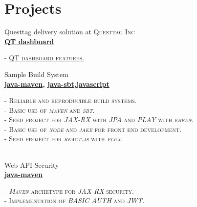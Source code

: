 \documentclass[10pt]{article} %
\begin{document}
{\begin{minipage}[t]{0.5\textwidth}
\section{Projects} 



{\raggedright\large Questtag delivery solution at \textsc{Questtag Inc}\\
\large\textbf{\href{https://dashboard.questtag.com}{QT dashboard}}\\[5pt]}

\textsc{- \href{http://www.questtag.com/features/}{QT dashboard features.}}\\




{\raggedright\large Sample Build System \\
	\large\textbf{\href {https://github.com/Bitaron/java-maven}{java-maven}, \href{https://github.com/Bitaron/java-sbt}{java-sbt},\href{https://github.com/Bitaron/js}{javascript}}\\[5pt]}
\textsc{- Reliable and reproducible build systems.}\\
\textsc{- Basic use of \textit{maven} and \textit{sbt}. }\\
\textsc{- Seed project for \textit{JAX-RX} with \textit{JPA} and \textit{PLAY} with \textit{ebean}.}\\
\textsc{- Basic use of \textit{node} and \textit{jake} for front end development. }\\
\textsc{- Seed project for \textit{react.js} with \textit{flux}.}\\
\normalsize{}\\





{\raggedright\large Web API Security \\
	\large\textbf{\href {https://github.com/Bitaron/java-maven/tree/security}{java-maven}}\\[5pt]}
\textsc{- \textit{Maven} archetype for  \textit{JAX-RX} security.}\\
\textsc{- Implementation of  \textit{BASIC AUTH} and  \textit{JWT}.}\\



\end{minipage}}
\end{document}

